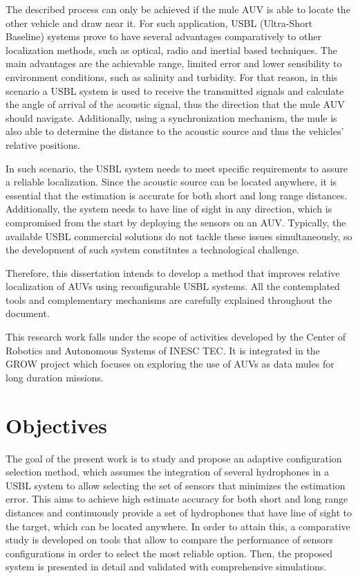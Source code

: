The described process can only be achieved if the mule AUV is able to locate the other vehicle and draw near it. For such application, USBL (Ultra-Short Baseline) systems prove to have several advantages comparatively to other localization methods, such as optical, radio and inertial based techniques. The main advantages are the achievable range, limited error and lower sensibility to environment conditions, such as salinity and turbidity. For that reason, in this scenario a USBL system is used to receive the transmitted signals and calculate the angle of arrival of the acoustic signal, thus the direction that the mule AUV should navigate. Additionally, using a synchronization mechanism, the mule is also able to determine the distance to the acoustic source and thus the vehicles' relative positions.

In such scenario, the USBL system needs to meet specific requirements to assure a reliable localization. Since the acoustic source can be located anywhere, it is essential that the estimation is accurate for both short and long range distances. Additionally, the system needs to have line of sight in any direction, which is compromised from the start by deploying the sensors on an AUV. Typically, the available USBL commercial solutions do not tackle these issues simultaneously, so the development of such system constitutes a technological challenge.

Therefore, this dissertation intends to develop a method that improves relative localization of AUVs using reconfigurable USBL systems. All the contemplated tools and complementary mechanisms are carefully explained throughout the document. 

This research work falls under the scope of activities developed by the Center of Robotics and Autonomous Systems of INESC TEC. It is integrated in the GROW project which focuses on exploring the use of AUVs as data mules for long duration missions.

\section{Objectives} \label{sec:objective}

The goal of the present work is to study and propose an adaptive configuration selection method, which assumes the integration of several hydrophones in a USBL system to allow selecting the set of sensors that minimizes the estimation error. This aims to achieve high estimate accuracy for both short and long range distances and continuously provide a set of hydrophones that have line of sight to the target, which can be located anywhere. In order to attain this, a comparative study is developed on tools that allow to compare the performance of sensors configurations in order to select the most reliable option. Then, the proposed system is presented in detail and validated with comprehensive simulations.


